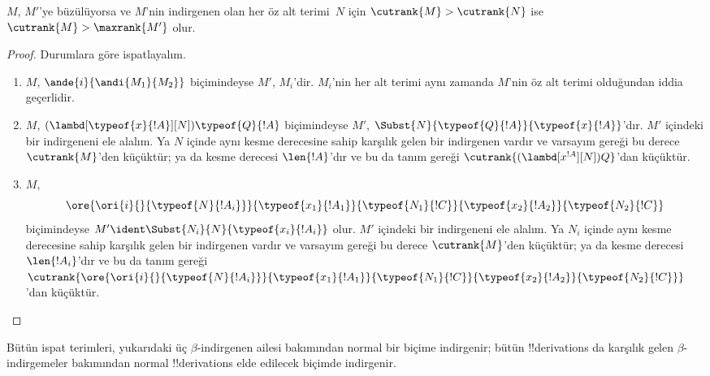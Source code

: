 \documentclass[../../../include/open-logic-section]{subfiles}
\begin{document}
\begin{lem}
  $M$, $M'$'ye büzülüyorsa ve $M$'nin indirgenen olan her öz alt
  terimi~$N$ için $\cutrank{M} > \cutrank{N}$ ise
  $\cutrank{M} > \maxrank{M'}$ olur.
\end{lem}

\begin{proof}
  Durumlara göre ispatlayalım.
  \begin{enumerate}
  \item $M$, $\ande{i}{\andi{M_1}{M_2}}$ biçimindeyse $M'$, $M_i$'dir.
    $M_i$'nin her alt terimi aynı zamanda $M$'nin öz alt terimi olduğundan
    iddia geçerlidir.
  \item $M$,
    $(\lambd[\typeof{x}{!A}][N])\typeof{Q}{!A}$ biçimindeyse $M'$,
    $\Subst{N}{\typeof{Q}{!A}}{\typeof{x}{!A}}$'dır. $M'$ içindeki bir
    indirgeneni ele alalım. Ya $N$ içinde aynı kesme derecesine sahip
    karşılık gelen bir indirgenen vardır ve varsayım gereği bu derece
    $\cutrank{M}$'den küçüktür; ya da kesme derecesi $\len{!A}$'dır ve bu
    da tanım gereği
    $\cutrank{(\lambd[x^{!A}][N])Q}$'dan küçüktür.
  \item $M$,
    \[
    \ore{\ori{i}{}{\typeof{N}{!A_i}}}
        {\typeof{x_1}{!A_1}}{\typeof{N_1}{!C}}
        {\typeof{x_2}{!A_2}}{\typeof{N_2}{!C}}
    \]
    biçimindeyse $M' \ident \Subst{N_i}{N}{\typeof{x_i}{!A_i}}$ olur.
    $M'$ içindeki bir indirgeneni ele alalım. Ya $N_i$ içinde aynı kesme
    derecesine sahip karşılık gelen bir indirgenen vardır ve varsayım gereği
    bu derece $\cutrank{M}$'den küçüktür; ya da kesme derecesi
    $\len{!A_i}$'dır ve bu da tanım gereği
    $\cutrank{\ore{\ori{i}{}{\typeof{N}{!A_i}}}
      {\typeof{x_1}{!A_1}}{\typeof{N_1}{!C}}
      {\typeof{x_2}{!A_2}}{\typeof{N_2}{!C}}}$'dan küçüktür.
  \end{enumerate}
\end{proof}

\begin{thm}
  Bütün ispat terimleri, yukarıdaki üç $\beta$-indirgenen ailesi bakımından
  normal bir biçime indirgenir; bütün !!{derivation}s da karşılık gelen
  $\beta$-indirgemeler bakımından normal !!{derivation}s elde edilecek biçimde
  indirgenir.
\end{thm}
\end{document}
